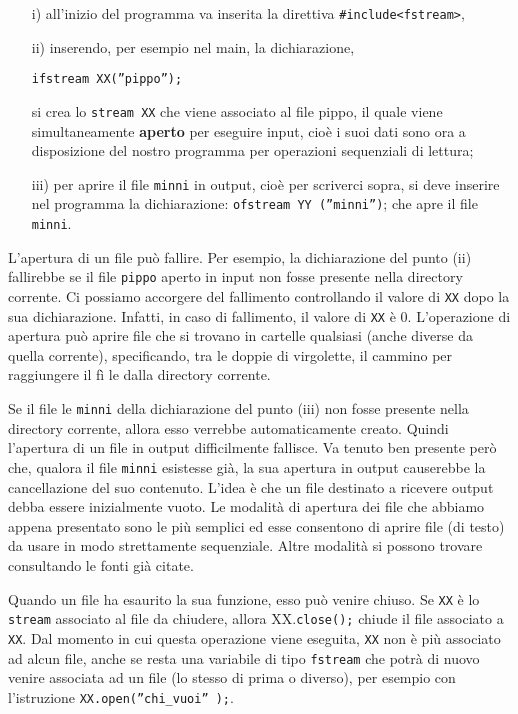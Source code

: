 \documentclass[a4paper,12pt]{book}
\begin{document}
\begin{enumerate}
\item[i)]	all'inizio del programma va inserita la direttiva \texttt{\#include<fstream>},

\item[ii)]	inserendo, per esempio nel main, la dichiarazione,

\noindent \texttt{ifstream XX(''pippo'');}
			
\noindent si crea lo \texttt{stream XX} che viene associato al file pippo, il quale vie­ne simultaneamente \textbf{aperto} per eseguire input, cioè i suoi dati sono ora a disposizione del nostro programma per operazioni sequenziali di lettura;

\item[iii)]	per aprire il file \texttt{minni} in output, cioè per scriverci sopra, si deve inserire nel programma la dichiarazione: \texttt{ofstream YY (''minni'')}; che apre il file \texttt{minni}.
\end{enumerate}


L'apertura di un file può fallire. Per esempio, la dichiarazione del punto (ii) fallirebbe se il file \texttt{pippo} aperto in input non fosse presente nella directory corrente. Ci possiamo accorgere del fallimento controllando il valore di \texttt{XX} dopo la sua dichiarazione. Infatti, in caso di fallimento, il valore di \texttt{XX} è 0. L'operazione di apertura può aprire file che si trovano in cartelle qualsiasi (anche diverse da quella corrente), specificando, tra le doppie di virgolette, il cammino per raggiungere il fì le dalla directory corrente. 

Se il file le \texttt{minni} della dichiarazione del punto (iii) non fosse presente nella directory corrente, allora esso verrebbe automaticamente creato. Quindi l'apertura di un file in output difficilmente fallisce. Va tenuto ben presente però che, qualora il file \texttt{minni} esistesse già, la sua apertura in output causerebbe la cancellazione del suo contenuto. L'idea è che un file destinato a ricevere output debba essere inizialmente vuoto. Le modalità di apertura dei file che abbiamo appena presentato sono le più semplici ed esse consentono di aprire file (di testo) da usare in modo strettamente sequenziale. Altre modalità si possono trovare consultando le fonti già citate. 

Quando un file ha esaurito la sua funzione, esso può venire chiuso. Se \texttt{XX} è lo \texttt{stream} associato al file da chiudere, allora XX.\texttt{close();} chiude il file associato a \texttt{XX}. Dal momento in cui questa operazione viene eseguita, \texttt{XX} non è più associato ad alcun file, anche se resta una variabile di tipo \texttt{fstream} che potrà di nuovo venire associata ad un file (lo stesso di prima o diverso), per esempio con l'istruzione \texttt{XX.open(''chi\_vuoi'' );}. 
\end{document}
